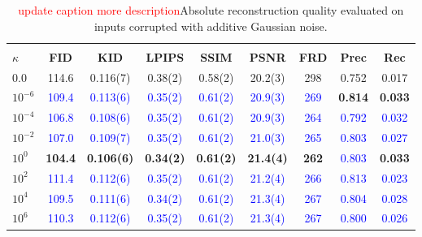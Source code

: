 \documentclass[twoside,11pt]{article}
\begin{document}
\begin{table}[ht!]
\centering
\renewcommand{\arraystretch}{1.4}
\setlength{\tabcolsep}{6pt}
\small
\begin{tabular}{lcccccccc}
\toprule
\rowcolor{gray!20}
\multicolumn{9}{c}{\textbf{Additive Gaussian Noise - Absolute Scores}} \\
\textbf{$\kappa$} & \textbf{FID} & \textbf{KID} & \textbf{LPIPS} & \textbf{SSIM} & \textbf{PSNR} & \textbf{FRD} & \textbf{Prec} & \textbf{Rec} \\
\midrule
$0.0$        & 114.6 & 0.116(7) & 0.38(2) & 0.58(2) & 20.2(3) & 298 & 0.752 & 0.017 \\
$10^{-6}$    & \textcolor{blue}{109.4} & \textcolor{blue}{0.113(6)} & \textcolor{blue}{0.35(2)} & \textcolor{blue}{0.61(2)} & \textcolor{blue}{20.9(3)} & \textcolor{blue}{269} & \textbf{\textcolor{green!50!black}{0.814}} & \textbf{\textcolor{green!50!black}{0.033}} \\
$10^{-4}$    & \textcolor{blue}{106.8} & \textcolor{blue}{0.108(6)} & \textcolor{blue}{0.35(2)} & \textcolor{blue}{0.61(2)} & \textcolor{blue}{20.9(3)} & \textcolor{blue}{264} & \textcolor{blue}{0.792} & \textcolor{blue}{0.032} \\
$10^{-2}$    & \textcolor{blue}{107.0} & \textcolor{blue}{0.109(7)} & \textcolor{blue}{0.35(2)} & \textcolor{blue}{0.61(2)} & \textcolor{blue}{21.0(3)} & \textcolor{blue}{265} & \textcolor{blue}{0.803} & \textcolor{blue}{0.027} \\
$10^{0}$     & \textbf{\textcolor{green!50!black}{104.4}} & \textbf{\textcolor{green!50!black}{0.106(6)}} & \textbf{\textcolor{green!50!black}{0.34(2)}} & \textbf{\textcolor{green!50!black}{0.61(2)}} & \textbf{\textcolor{green!50!black}{21.4(4)}} & \textbf{\textcolor{green!50!black}{262}} & \textcolor{blue}{0.803} & \textbf{\textcolor{green!50!black}{0.033}} \\
$10^{2}$     & \textcolor{blue}{111.4} & \textcolor{blue}{0.112(6)} & \textcolor{blue}{0.35(2)} & \textcolor{blue}{0.61(2)} & \textcolor{blue}{21.2(4)} & \textcolor{blue}{266} & \textcolor{blue}{0.813} & \textcolor{blue}{0.023} \\
$10^{4}$     & \textcolor{blue}{109.5} & \textcolor{blue}{0.111(6)} & \textcolor{blue}{0.34(2)} & \textcolor{blue}{0.61(2)} & \textcolor{blue}{21.3(4)} & \textcolor{blue}{267} & \textcolor{blue}{0.804} & \textcolor{blue}{0.028} \\
$10^{6}$     & \textcolor{blue}{110.3} & \textcolor{blue}{0.112(6)} & \textcolor{blue}{0.35(2)} & \textcolor{blue}{0.61(2)} & \textcolor{blue}{21.3(4)} & \textcolor{blue}{267} & \textcolor{blue}{0.800} & \textcolor{blue}{0.026} \\
\bottomrule
\end{tabular}
\caption{\textcolor{red}{update caption more description}Absolute reconstruction quality evaluated on inputs corrupted with additive Gaussian noise.}
\label{tab:robustness_gaussian_abs}
\end{table}
\end{document}
